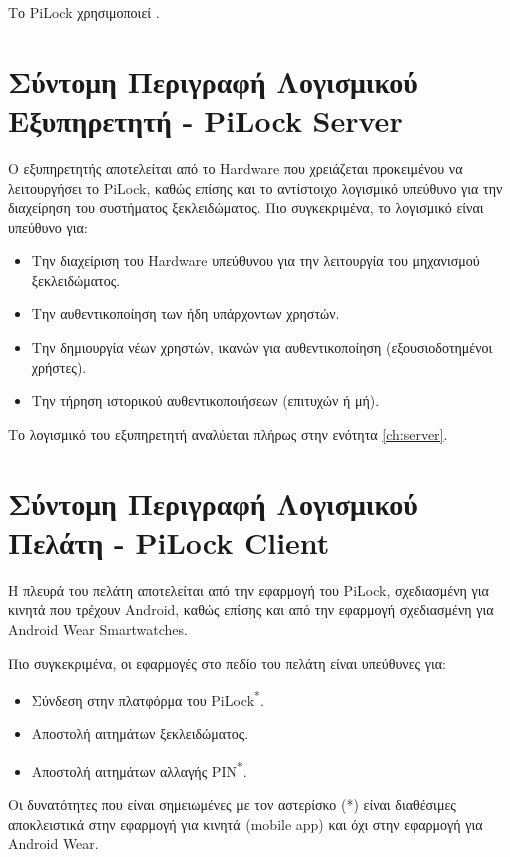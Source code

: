 \label{ch:structure}
Το PiLock χρησιμοποιεί .

\section{Σύντομη Περιγραφή Λογισμικού Εξυπηρετητή - PiLock Server}
	Ο εξυπηρετητής αποτελείται από το Hardware που χρειάζεται προκειμένου να λειτουργήσει το PiLock, καθώς επίσης και το αντίστοιχο λογισμικό υπεύθυνο για την διαχείρηση του συστήματος ξεκλειδώματος. Πιο συγκεκριμένα, το λογισμικό είναι υπεύθυνο για:
	\begin{itemize}
		\item Την διαχείριση του Hardware υπεύθυνου για την λειτουργία του μηχανισμού ξεκλειδώματος.
		\item Την αυθεντικοποίηση των ήδη υπάρχοντων χρηστών.
		\item Την δημιουργία νέων χρηστών, ικανών για αυθεντικοποίηση (εξουσιοδοτημένοι χρήστες).
		\item Την τήρηση ιστορικού αυθεντικοποιήσεων (επιτυχών ή μή).
	\end{itemize}
	Το λογισμικό του εξυπηρετητή αναλύεται πλήρως στην ενότητα \ref{ch:server}. %

\section{Σύντομη Περιγραφή Λογισμικού Πελάτη - PiLock Client}
	\label{sec:pilock_client_overview}
	Η πλευρά του πελάτη αποτελείται από την εφαρμογή του PiLock, σχεδιασμένη για κινητά που τρέχουν Android, καθώς επίσης και από την εφαρμογή σχεδιασμένη για Android Wear Smartwatches.

	Πιο συγκεκριμένα, οι εφαρμογές στο πεδίο του πελάτη είναι υπεύθυνες για:

	\begin{itemize}
		\item Σύνδεση στην πλατφόρμα του PiLock\textsuperscript{*}.
		\item Αποστολή αιτημάτων ξεκλειδώματος.
		\item Αποστολή αιτημάτων αλλαγής PIN\textsuperscript{*}.
	\end{itemize}
	{\footnotesize Οι δυνατότητες που είναι σημειωμένες με τον αστερίσκο (*) είναι διαθέσιμες αποκλειστικά στην εφαρμογή για κινητά (mobile app) και όχι στην εφαρμογή για Android Wear.}

